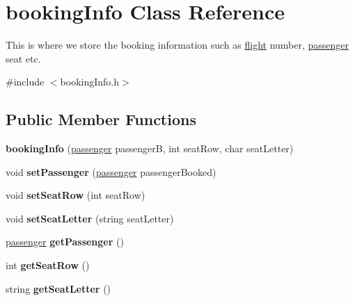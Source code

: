 \hypertarget{classbooking_info}{
\section{bookingInfo Class Reference}
\label{classbooking_info}
}


This is where we store the booking information such as \hyperlink{classflight}{flight} number, \hyperlink{classpassenger}{passenger} seat etc.  


{\ttfamily \#include $<$bookingInfo.h$>$}\subsection*{Public Member Functions}
\begin{DoxyCompactItemize}
\item 
\hypertarget{classbooking_info_ad37eef4308d246640b46c37537cd6bb8}{
{\bfseries bookingInfo} (\hyperlink{classpassenger}{passenger} passengerB, int seatRow, char seatLetter)}
\label{classbooking_info_ad37eef4308d246640b46c37537cd6bb8}

\item 
\hypertarget{classbooking_info_a9448a7db1d669c76e562ca9a637d7524}{
void {\bfseries setPassenger} (\hyperlink{classpassenger}{passenger} passengerBooked)}
\label{classbooking_info_a9448a7db1d669c76e562ca9a637d7524}

\item 
\hypertarget{classbooking_info_ab390fdfc2ceffe97dd3a292c46f815e0}{
void {\bfseries setSeatRow} (int seatRow)}
\label{classbooking_info_ab390fdfc2ceffe97dd3a292c46f815e0}

\item 
\hypertarget{classbooking_info_a8044bea7067004778e9b88f64807fdd0}{
void {\bfseries setSeatLetter} (string seatLetter)}
\label{classbooking_info_a8044bea7067004778e9b88f64807fdd0}

\item 
\hypertarget{classbooking_info_ad5f69c9da605b2ca960942bd27ba197f}{
\hyperlink{classpassenger}{passenger} {\bfseries getPassenger} ()}
\label{classbooking_info_ad5f69c9da605b2ca960942bd27ba197f}

\item 
\hypertarget{classbooking_info_a851c6399e79afee046f4992de2337d51}{
int {\bfseries getSeatRow} ()}
\label{classbooking_info_a851c6399e79afee046f4992de2337d51}

\item 
\hypertarget{classbooking_info_a605cc4b17c3f7e53b48c4050563fd708}{
string {\bfseries getSeatLetter} ()}
\label{classbooking_info_a605cc4b17c3f7e53b48c4050563fd708}

\end{DoxyCompactItemize}


